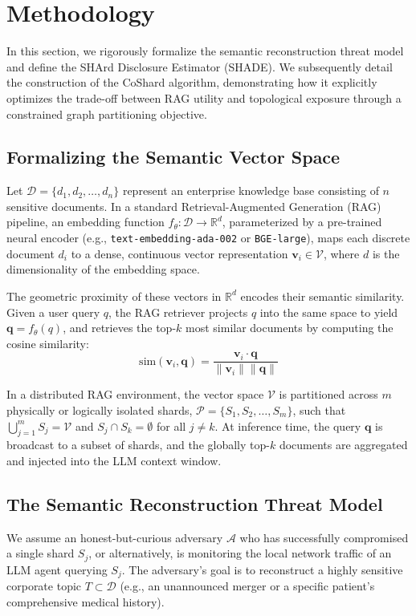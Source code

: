 \section{Methodology}
\label{sec:methodology}

In this section, we rigorously formalize the semantic reconstruction threat model and define the SHArd Disclosure Estimator (SHADE). We subsequently detail the construction of the CoShard algorithm, demonstrating how it explicitly optimizes the trade-off between RAG utility and topological exposure through a constrained graph partitioning objective.

\subsection{Formalizing the Semantic Vector Space}
Let $\mathcal{D} = \{d_1, d_2, \dots, d_n\}$ represent an enterprise knowledge base consisting of $n$ sensitive documents. In a standard Retrieval-Augmented Generation (RAG) pipeline, an embedding function $f_\theta : \mathcal{D} \to \mathbb{R}^d$, parameterized by a pre-trained neural encoder (e.g., \texttt{text-embedding-ada-002} or \texttt{BGE-large}), maps each discrete document $d_i$ to a dense, continuous vector representation $\mathbf{v}_i \in \mathcal{V}$, where $d$ is the dimensionality of the embedding space.

The geometric proximity of these vectors in $\mathbb{R}^d$ encodes their semantic similarity. Given a user query $q$, the RAG retriever projects $q$ into the same space to yield $\mathbf{q} = f_\theta(q)$, and retrieves the top-$k$ most similar documents by computing the cosine similarity:
\begin{equation}
\text{sim}(\mathbf{v}_i, \mathbf{q}) = \frac{\mathbf{v}_i \cdot \mathbf{q}}{\|\mathbf{v}_i\| \|\mathbf{q}\|}
\end{equation}

In a distributed RAG environment, the vector space $\mathcal{V}$ is partitioned across $m$ physically or logically isolated shards, $\mathcal{P} = \{S_1, S_2, \dots, S_m\}$, such that $\bigcup_{j=1}^m S_j = \mathcal{V}$ and $S_j \cap S_k = \emptyset$ for all $j \neq k$. At inference time, the query $\mathbf{q}$ is broadcast to a subset of shards, and the globally top-$k$ documents are aggregated and injected into the LLM context window.

\subsection{The Semantic Reconstruction Threat Model}
We assume an honest-but-curious adversary $\mathcal{A}$ who has successfully compromised a single shard $S_j$, or alternatively, is monitoring the local network traffic of an LLM agent querying $S_j$. The adversary's goal is to reconstruct a highly sensitive corporate topic $T \subset \mathcal{D}$ (e.g., an unannounced merger or a specific patient's comprehensive medical history).

